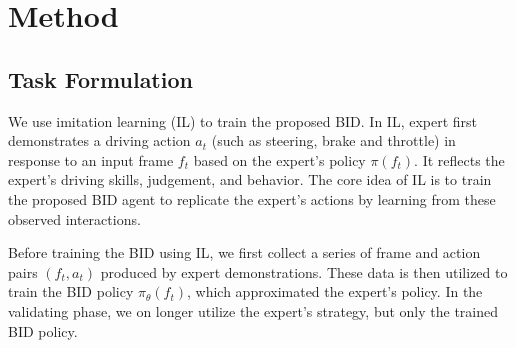 \section{Method}

\subsection{Task Formulation}

\hspace{1pc}We use imitation learning (IL) to train the proposed BID.
In IL, expert first demonstrates a driving action $a_{t}$ (such as steering, brake and throttle) in response to an input frame $f_t$ based on the expert's policy $\pi(f_{t})$.
It reflects the expert's driving skills, judgement, and behavior.
The core idea of IL is to train the proposed BID agent to replicate the expert's actions by learning from these observed interactions.


Before training the BID using IL, we first collect a series of frame and action pairs $(f_{t}, a_{t})$ produced by expert demonstrations.
These data is then utilized to train the BID policy $\pi_{\theta}(f_{t})$, which approximated the expert's policy.
%
In the validating phase, we on longer utilize the expert's strategy, but only the trained BID policy.


